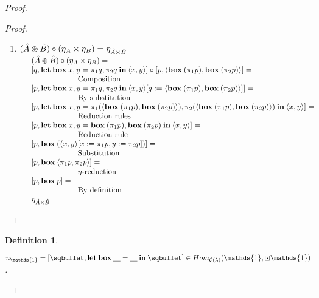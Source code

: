 \documentclass[a4paper]{article}
\newtheorem{defin}{Definition}
\begin{document}
\begin{proof}
\begin{proof}
\begin{enumerate}
\item $(\hat{A} \varoast \hat{B}) \circ (\eta_{A} \times \eta_{B}) = \eta_{\hat{A} \times \hat{B}}$ \\

$\begin{array}{lll}
& (\hat{A} \varoast \hat{B}) \circ (\eta_{A} \times \eta_{B}) = & \\
& [q, {\bf let \: box \:} x, y = \pi_1 q, \pi_2 q {\: \bf in \:} \langle x, y \rangle] \circ [p, \langle {\bf box \:} (\pi_1 p), {\bf box \:} (\pi_2 p) \rangle] = & \\
& \quad\quad\quad\quad\quad\quad \text{Composition}& \\
& [p, {\bf let \: box \:} x, y = \pi_1 q, \pi_2 q {\: \bf in \:} \langle x, y \rangle [q := \langle {\bf box \:} (\pi_1 p), {\bf box \:} (\pi_2 p) \rangle]] = & \\
& \quad\quad\quad\quad\quad\quad \text{By substitution}& \\
& [p, {\bf let \: box \:} x, y = \pi_1 (\langle {\bf box \:} (\pi_1 p), {\bf box \:} (\pi_2 p) \rangle), \pi_2 (\langle {\bf box \:} (\pi_1 p), {\bf box \:} (\pi_2 p) \rangle) {\: \bf in \:} \langle x, y \rangle] = & \\
& \quad\quad\quad\quad\quad\quad \text{Reduction rules}& \\
& [p, {\bf let \: box \:} x, y = {\bf box \:} (\pi_1 p), {\bf box \:} (\pi_2 p) {\: \bf in \:} \langle x, y \rangle] = & \\
& \quad\quad\quad\quad\quad\quad \text{Reduction rule}& \\
& [p, {\bf box \:} (\langle x,y \rangle [x := \pi_1 p, y := \pi_2 p])] = & \\
& \quad\quad\quad\quad\quad\quad \text{Substitution}& \\
& [p, {\bf box \:} \langle \pi_1 p, \pi_2 p \rangle] = & \\
& \quad\quad\quad\quad\quad\quad \text{$\eta$-reduction}& \\
& [p, {\bf box \:} p] =& \\
& \quad\quad\quad\quad\quad\quad \text{By definition}& \\
& \eta_{\hat{A} \times \hat{B}}&
\end{array}$
\end{enumerate}
\end{proof}

\begin{defin}
  $ $

  $u_{\mathds{1}} = [\sqbullet, {\bf let \: box \:} \underline{\quad} = \underline{\quad} {\: \bf in \:} \sqbullet] \in Hom_{\mathcal{C}(\lambda)}(\mathds{1}, \boxdot \mathds{1})$.
\end{defin}


\end{proof}
\end{document}
